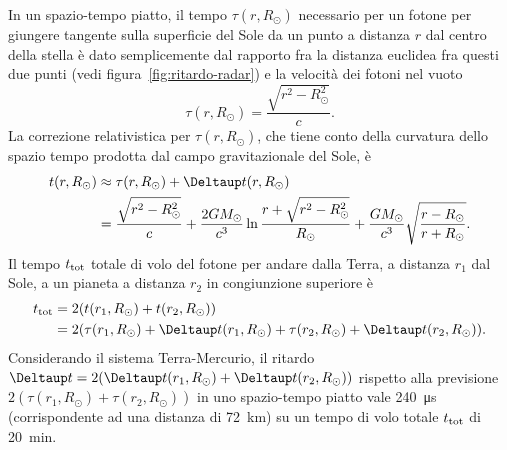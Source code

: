 In un spazio-tempo piatto, il tempo $\tau(r,R_{\odot})$ necessario per un fotone
per giungere tangente sulla superficie del Sole da un punto a distanza $r$ dal
centro della stella è dato semplicemente dal rapporto fra la distanza euclidea
fra questi due punti (vedi figura~\ref{fig:ritardo-radar}) e la velocità dei
fotoni nel vuoto
\begin{equation}
  \tau(r, R_{\odot}) = \frac{\sqrt{r^{2} - R_{\odot}^{2}}}{c}.
\end{equation}
La correzione relativistica per $\tau(r, R_{\odot})$, che tiene conto della
curvatura dello spazio tempo prodotta dal campo gravitazionale del Sole, è
\begin{equation}
  \begin{split}
    t(r,R_{\odot}) &\approx \tau(r,R_{\odot}) + \var t(r,R_{\odot}) \\
    &= \frac{\sqrt{r^{2} - R_{\odot}^{2}}}{c} + \frac{2GM_{\odot}}{c^{3}} \ln
    \frac{r + \sqrt{r^{2} - R_{\odot}^{2}}}{R_{\odot}} +
    \frac{GM_{\odot}}{c^{3}} \sqrt{\frac{r - R_{\odot}}{r + R_{\odot}}}.
  \end{split}
\end{equation}
Il tempo $t_{\textup{tot}}$ totale di volo del fotone per andare dalla Terra, a
distanza $r_{1}$ dal Sole, a un pianeta a distanza $r_{2}$ in congiunzione
superiore è
\begin{equation}
  \begin{split}
    t_{\textup{tot}} &= 2(t(r_{1},R_{\odot}) + t(r_{2},R_{\odot})) \\
    &= 2(\tau(r_{1},R_{\odot}) + \var t(r_{1},R_{\odot}) +
    \tau(r_{2},R_{\odot}) + \var t(r_{2},R_{\odot})).
  \end{split}
\end{equation}
Considerando il sistema Terra-Mercurio, il ritardo
$\var t = 2(\var t(r_{1},R_{\odot}) + \var t(r_{2},R_{\odot}))$ rispetto alla
previsione $2(\tau(r_{1},R_{\odot}) + \tau(r_{2},R_{\odot}))$ in uno
spazio-tempo piatto vale \SI{240}{\micro\second}
(corrispondente ad una distanza di \SI{72}{\kilo\metre})
su un tempo di volo totale $t_{\textup{tot}}$ di
\SI{20}{\minute}.

